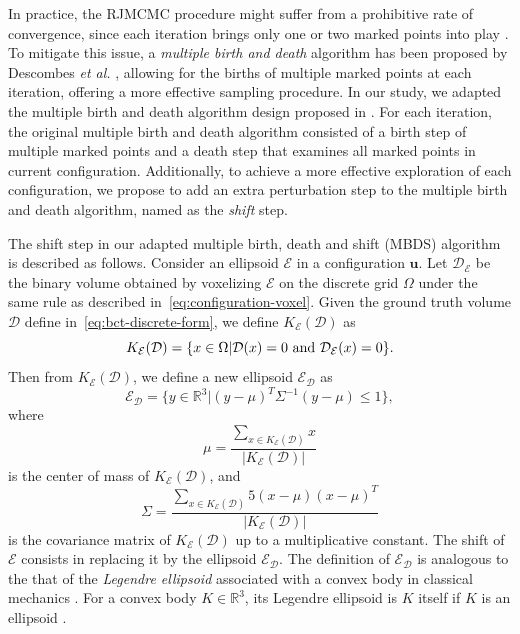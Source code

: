 \documentclass[journal]{IEEEtran}
\begin{document}
In practice, the RJMCMC procedure might suffer from a prohibitive rate
of convergence, since each iteration brings only one or two marked
points into play \cite{descombes2013stochastic}. To mitigate this
issue, a \textit{multiple birth and death} algorithm has been proposed
by Descombes \textit{et al.} \cite{descombes2009object}, allowing for
the births of multiple marked points at each iteration, offering a
more effective sampling procedure. In our study, we adapted the
multiple birth and death algorithm design proposed in
\cite{descombes2009object}. For each iteration, the original multiple
birth and death algorithm consisted of a birth step of multiple marked
points and a death step that examines all marked points in current
configuration. Additionally, to achieve a more effective exploration
of each configuration, we propose to add an extra perturbation step to
the multiple birth and death algorithm, named as the \textit{shift}
step.

The shift step in our adapted multiple birth, death and shift (MBDS)
algorithm is described as follows. Consider an ellipsoid $\mathcal{E}$
in a configuration $\mathbf{u}$. Let $\mathcal{D}_{\mathcal{E}}$ be
the binary volume obtained by voxelizing $\mathcal{E}$ on the discrete
grid $\Omega$ under the same rule as described
in~\eqref{eq:configuration-voxel}. Given the ground truth volume
$\mathcal{D}$ define in~\eqref{eq:bct-discrete-form}, we define
$K_{\mathcal{E}}(\mathcal{D})$ as
\begin{equation}
  \label{eq:overlap-voxels}
  K_{\mathcal{E}}(\mathcal{D}) = \{x \in \Omega |
  \mathcal{D}(x) = 0 \textnormal{ and }
  \mathcal{D}_{\mathcal{E}}(x) = 0 \}.
\end{equation}
Then from $K_{\mathcal{E}}(\mathcal{D})$, we define a new ellipsoid
$\mathcal{E}_{\mathcal{D}}$ as
\begin{equation}
  \label{eq:ellip-approx}
  \mathcal{E}_{\mathcal{D}} = \{ y \in \mathbb{R}^{3} |
  (y-\mu)^T \Sigma^{-1} (y-\mu) \leq 1 \},
\end{equation}
where
$$
\mu = \frac{\sum_{x \in K_{\mathcal{E}}(\mathcal{D})} x }{
  |K_{\mathcal{E}}(\mathcal{D})| }
$$
is the center of mass of $K_{\mathcal{E}}(\mathcal{D})$, and
$$
\Sigma = \frac{\sum_{x \in K_{\mathcal{E}}(\mathcal{D})} 5(x - \mu)(x
  - \mu)^T } { |K_{\mathcal{E}}(\mathcal{D})| }
$$
is the covariance matrix of $K_{\mathcal{E}}(\mathcal{D})$ up to a
multiplicative constant. The shift of $\mathcal{E}$ consists in
replacing it by the ellipsoid $\mathcal{E}_{\mathcal{D}}$. The
definition of $\mathcal{E}_{\mathcal{D}}$ is analogous to the that of
the \textit{Legendre ellipsoid} associated with a convex body in
classical mechanics \cite{lutwak2000new}. For a convex body
$K \in \mathbb{R}^3$, its Legendre ellipsoid is $K$ itself if $K$ is
an ellipsoid \cite{ludwig2003ellipsoids}.
\end{document}
